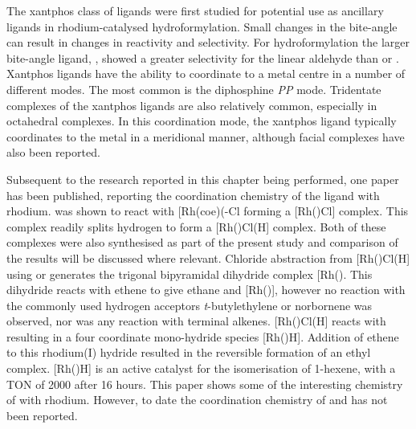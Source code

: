 
The xantphos class of ligands were first studied for potential use as ancillary ligands in rhodium-catalysed hydroformylation\cite{Kranenburg1995}.  Small changes in the bite-angle can result in changes in reactivity and selectivity.  For hydroformylation the larger bite-angle ligand, \Phxantphos{}, showed a greater selectivity for the linear aldehyde than \Phsixantphos{} or \Phthixantphos{}.  Xantphos ligands have the ability to coordinate to a metal centre in a number of different modes.  The most common is the diphosphine \dento{}\emph{PP\textprime} mode.  Tridentate \POP{} complexes of the xantphos ligands are also relatively common, especially in octahedral complexes.  In this \POP{} coordination mode, the xantphos ligand typically coordinates to the metal in a meridional manner, although facial complexes have also been reported.\cite{Dallanegra2012, Pawley2012}  

Subsequent to the research reported in this chapter being performed, one paper has been published, reporting the coordination chemistry of the \tBuxantphos{} ligand with rhodium.\cite{Haibach2013}  \tBuXantphos{} was shown to react with [Rh(coe)(\hapto{}-Cl\ce{]2} forming a [Rh(\tBuxantphosk)Cl] complex.  This complex readily splits hydrogen to form a [Rh(\tBuxantphosk)Cl(H] complex.  Both of these complexes were also synthesised as part of the present study and comparison of the results will be discussed where relevant.  Chloride abstraction from  [Rh(\tBuxantphosk)Cl(H] using  or  generates the trigonal bipyramidal dihydride complex [Rh(\tBuxantphosk)\ce{(H)2]+}.  This dihydride reacts with ethene to give ethane and [Rh(\tBuxantphosk)], however no reaction with the commonly used hydrogen acceptors \emph{t}-butylethylene or norbornene was observed, nor was any reaction with terminal alkenes.  [Rh(\tBuxantphosk)Cl(H] reacts with  resulting in a four coordinate mono-hydride species [Rh(\tBuxantphos)H].  Addition of ethene to this rhodium(I) hydride resulted in the reversible formation of an ethyl complex.  [Rh(\tBuxantphos)H] is an active catalyst for the isomerisation of 1-hexene, with a TON of 2000 after 16 hours.  This paper shows some of the interesting chemistry of \tBuxantphos{} with rhodium.  However, to date the coordination chemistry of \tBusixantphos{} and \tButhixantphos{} has not been reported.  

